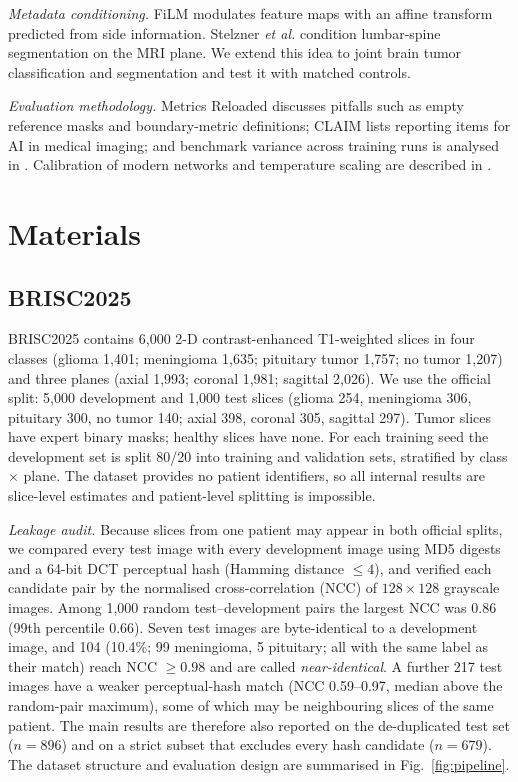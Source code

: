 \documentclass[journal]{IEEEtran}
\begin{document}
\textit{Metadata conditioning.} FiLM \cite{perez2018film} modulates feature maps with an affine transform predicted from side information. Stelzner \textit{et al.} \cite{stelzner2024recognition} condition lumbar-spine segmentation on the MRI plane. We extend this idea to joint brain tumor classification and segmentation and test it with matched controls.

\textit{Evaluation methodology.} Metrics Reloaded \cite{maierhein2024metrics} discusses pitfalls such as empty reference masks and boundary-metric definitions; CLAIM \cite{mongan2020claim} lists reporting items for AI in medical imaging; and benchmark variance across training runs is analysed in \cite{bouthillier2021accounting}. Calibration of modern networks and temperature scaling are described in \cite{guo2017calibration,dawood2023uncertainty}.

\section{Materials}
\subsection{BRISC2025}
BRISC2025 \cite{fateh2026brisc} contains 6{,}000 2-D contrast-enhanced T1-weighted slices in four classes (glioma 1{,}401; meningioma 1{,}635; pituitary tumor 1{,}757; no tumor 1{,}207) and three planes (axial 1{,}993; coronal 1{,}981; sagittal 2{,}026). We use the official split: 5{,}000 development and 1{,}000 test slices (glioma 254, meningioma 306, pituitary 300, no tumor 140; axial 398, coronal 305, sagittal 297). Tumor slices have expert binary masks; healthy slices have none. For each training seed the development set is split 80/20 into training and validation sets, stratified by class $\times$ plane. The dataset provides no patient identifiers, so all internal results are slice-level estimates and patient-level splitting is impossible.

\textit{Leakage audit.} Because slices from one patient may appear in both official splits, we compared every test image with every development image using MD5 digests and a 64-bit DCT perceptual hash (Hamming distance $\le 4$), and verified each candidate pair by the normalised cross-correlation (NCC) of $128\times128$ grayscale images. Among 1{,}000 random test--development pairs the largest NCC was 0.86 (99th percentile 0.66). Seven test images are byte-identical to a development image, and 104 (10.4\%; 99 meningioma, 5 pituitary; all with the same label as their match) reach NCC $\ge 0.98$ and are called \textit{near-identical}. A further 217 test images have a weaker perceptual-hash match (NCC 0.59--0.97, median above the random-pair maximum), some of which may be neighbouring slices of the same patient. The main results are therefore also reported on the de-duplicated test set ($n=896$) and on a strict subset that excludes every hash candidate ($n=679$). The dataset structure and evaluation design are summarised in Fig.~\ref{fig:pipeline}.
\end{document}
